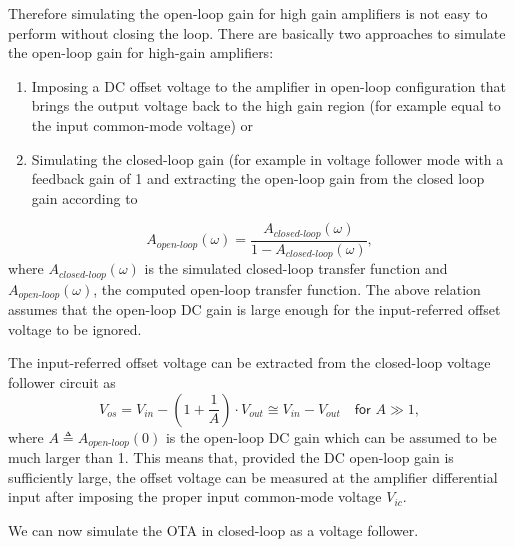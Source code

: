 \documentclass[
  a4paper,
  DIV=11,
  numbers=noendperiod]{scrreprt}
\providecommand{\tightlist}{%
  \setlength{\itemsep}{0pt}\setlength{\parskip}{0pt}}\usepackage{longtable,booktabs,array}
\begin{document}
Therefore simulating the open-loop gain for high gain amplifiers is not
easy to perform without closing the loop. There are basically two
approaches to simulate the open-loop gain for high-gain amplifiers:

\begin{enumerate}
\def\labelenumi{\arabic{enumi})}
\tightlist
\item
  Imposing a DC offset voltage to the amplifier in open-loop
  configuration that brings the output voltage back to the high gain
  region (for example equal to the input common-mode voltage) or
\item
  Simulating the closed-loop gain (for example in voltage follower mode
  with a feedback gain of 1 and extracting the open-loop gain from the
  closed loop gain according to
\end{enumerate}

\begin{equation}
  A_{open\textsf{-}loop}(\omega)= \frac{A_{closed\textsf{-}loop}(\omega)}{1 - A_{closed\textsf{-}loop}(\omega)},
\end{equation} where \(A_{closed\textsf{-}loop}(\omega)\) is the
simulated closed-loop transfer function and
\(A_{open\textsf{-}loop}(\omega)\), the computed open-loop transfer
function. The above relation assumes that the open-loop DC gain is large
enough for the input-referred offset voltage to be ignored.

The input-referred offset voltage can be extracted from the closed-loop
voltage follower circuit as \begin{equation}
  V_{os} = V_{in} - \left(1+\frac{1}{A}\right) \cdot V_{out} \cong V_{in} - V_{out} \quad \textsf{for $A \gg 1$},
\end{equation} where \(A \triangleq A_{open\textsf{-}loop}(0)\) is the
open-loop DC gain which can be assumed to be much larger than 1. This
means that, provided the DC open-loop gain is sufficiently large, the
offset voltage can be measured at the amplifier differential input after
imposing the proper input common-mode voltage \(V_{ic}\).

We can now simulate the OTA in closed-loop as a voltage follower.
\end{document}
